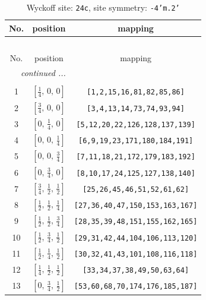\documentclass[fleqn,8pt]{jsarticle}
\begin{document}
\begin{longtable}{ccc}
\caption{Wyckoff site: {\tt 24c}, site symmetry: {\tt -4'm.2'}}
 \\
 \hline \hline
No. & position & mapping \\ \hline \endfirsthead

\multicolumn{2}{l}{\tablename\ \thetable{}} \\
 \hline \hline
No. & position & mapping \\ \hline \endhead

 \hline \hline
\multicolumn{2}{r}{\footnotesize\it continued ...} \\ \endfoot

 \hline \hline
\multicolumn{2}{r}{} \\ \endlastfoot

1 & $\left[ \frac{1}{4},\, 0,\, 0 \right]$ & {\tt [1,2,15,16,81,82,85,86]} \\ \hline
2 & $\left[ \frac{3}{4},\, 0,\, 0 \right]$ & {\tt [3,4,13,14,73,74,93,94]} \\ \hline
3 & $\left[ 0,\, \frac{1}{4},\, 0 \right]$ & {\tt [5,12,20,22,126,128,137,139]} \\ \hline
4 & $\left[ 0,\, 0,\, \frac{1}{4} \right]$ & {\tt [6,9,19,23,171,180,184,191]} \\ \hline
5 & $\left[ 0,\, 0,\, \frac{3}{4} \right]$ & {\tt [7,11,18,21,172,179,183,192]} \\ \hline
6 & $\left[ 0,\, \frac{3}{4},\, 0 \right]$ & {\tt [8,10,17,24,125,127,138,140]} \\ \hline
7 & $\left[ \frac{3}{4},\, \frac{1}{2},\, \frac{1}{2} \right]$ & {\tt [25,26,45,46,51,52,61,62]} \\ \hline
8 & $\left[ \frac{1}{2},\, \frac{1}{2},\, \frac{1}{4} \right]$ & {\tt [27,36,40,47,150,153,163,167]} \\ \hline
9 & $\left[ \frac{1}{2},\, \frac{1}{2},\, \frac{3}{4} \right]$ & {\tt [28,35,39,48,151,155,162,165]} \\ \hline
10 & $\left[ \frac{1}{2},\, \frac{3}{4},\, \frac{1}{2} \right]$ & {\tt [29,31,42,44,104,106,113,120]} \\ \hline
11 & $\left[ \frac{1}{2},\, \frac{1}{4},\, \frac{1}{2} \right]$ & {\tt [30,32,41,43,101,108,116,118]} \\ \hline
12 & $\left[ \frac{1}{4},\, \frac{1}{2},\, \frac{1}{2} \right]$ & {\tt [33,34,37,38,49,50,63,64]} \\ \hline
13 & $\left[ 0,\, \frac{3}{4},\, \frac{1}{2} \right]$ & {\tt [53,60,68,70,174,176,185,187]} \\ \hline

\end{longtable}
\end{document}
